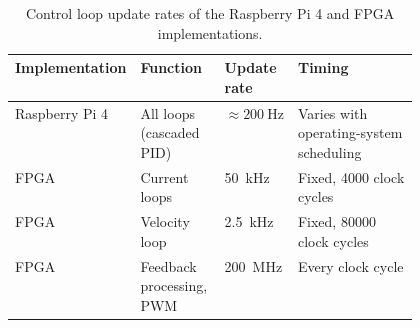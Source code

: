 \begin{table}[htbp]
	\centering
	\caption{Control loop update rates of the Raspberry Pi 4 and FPGA implementations.}
	\label{tab:update_rates}
	\begin{tabular}{@{}ll>{\raggedright\arraybackslash}p{0.17\linewidth}>{\raggedright\arraybackslash}p{0.3\linewidth}@{}}
		\toprule
		Implementation & Function & Update rate & Timing \\
		\midrule
		Raspberry Pi 4 & All loops (cascaded PID) & $\approx\SI{200}{\hertz}$ & Varies with operating-system scheduling \\
		FPGA & Current loops & \SI{50}{\kilo\hertz} & Fixed, 4000 clock cycles \\
		FPGA & Velocity loop & \SI{2.5}{\kilo\hertz} & Fixed, 80000 clock cycles \\
		FPGA & Feedback processing, PWM & \SI{200}{\mega\hertz} & Every clock cycle \\
		\bottomrule
	\end{tabular}
\end{table}
